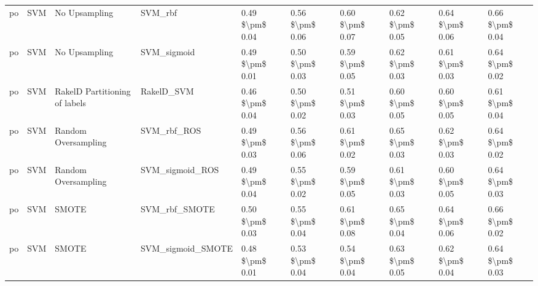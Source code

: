 \begin{tabular}{llllllllll}
      po &                             SVM &                 No Upsampling &                                      SVM\_rbf & 0.49 \$\textbackslash pm\$ 0.04 &           0.56 \$\textbackslash pm\$ 0.06 &       0.60 \$\textbackslash pm\$ 0.07 &        0.62 \$\textbackslash pm\$ 0.05 &                         0.64 \$\textbackslash pm\$ 0.06 &     0.66 \$\textbackslash pm\$ 0.04 \\
      po &                             SVM &                 No Upsampling &                                  SVM\_sigmoid & 0.49 \$\textbackslash pm\$ 0.01 &           0.50 \$\textbackslash pm\$ 0.03 &       0.59 \$\textbackslash pm\$ 0.05 &        0.62 \$\textbackslash pm\$ 0.03 &                         0.61 \$\textbackslash pm\$ 0.03 &     0.64 \$\textbackslash pm\$ 0.02 \\
      po &                             SVM & RakelD Partitioning of labels &                                   RakelD\_SVM & 0.46 \$\textbackslash pm\$ 0.04 &           0.50 \$\textbackslash pm\$ 0.02 &       0.51 \$\textbackslash pm\$ 0.03 &        0.60 \$\textbackslash pm\$ 0.05 &                         0.60 \$\textbackslash pm\$ 0.05 &     0.61 \$\textbackslash pm\$ 0.04 \\
      po &                             SVM &           Random Oversampling &                                  SVM\_rbf\_ROS & 0.49 \$\textbackslash pm\$ 0.03 &           0.56 \$\textbackslash pm\$ 0.06 &       0.61 \$\textbackslash pm\$ 0.02 &        0.65 \$\textbackslash pm\$ 0.03 &                         0.62 \$\textbackslash pm\$ 0.03 &     0.64 \$\textbackslash pm\$ 0.02 \\
      po &                             SVM &           Random Oversampling &                              SVM\_sigmoid\_ROS & 0.49 \$\textbackslash pm\$ 0.04 &           0.55 \$\textbackslash pm\$ 0.02 &       0.59 \$\textbackslash pm\$ 0.05 &        0.61 \$\textbackslash pm\$ 0.03 &                         0.60 \$\textbackslash pm\$ 0.05 &     0.64 \$\textbackslash pm\$ 0.03 \\
      po &                             SVM &                         SMOTE &                                SVM\_rbf\_SMOTE & 0.50 \$\textbackslash pm\$ 0.03 &           0.55 \$\textbackslash pm\$ 0.04 &       0.61 \$\textbackslash pm\$ 0.08 &        0.65 \$\textbackslash pm\$ 0.04 &                         0.64 \$\textbackslash pm\$ 0.06 &     0.66 \$\textbackslash pm\$ 0.02 \\
      po &                             SVM &                         SMOTE &                            SVM\_sigmoid\_SMOTE & 0.48 \$\textbackslash pm\$ 0.01 &           0.53 \$\textbackslash pm\$ 0.04 &       0.54 \$\textbackslash pm\$ 0.04 &        0.63 \$\textbackslash pm\$ 0.05 &                         0.62 \$\textbackslash pm\$ 0.04 &     0.64 \$\textbackslash pm\$ 0.03 \\

\end{tabular}
